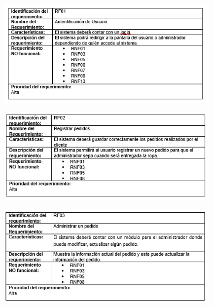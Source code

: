 \begin{figure}[htb]
\begin{center}
\includegraphics[width=11cm]{./imagenes/tablas/RF01.png}
\end{center}

\end{figure}



\begin{figure}[htb]
\begin{center}
\includegraphics[width=11cm]{./imagenes/tablas/RF02.png}
\end{center}

\end{figure}




\begin{figure}[htb]
\begin{center}
\includegraphics[width=11cm]{./imagenes/tablas/RF03.png}
\end{center}

\end{figure}

